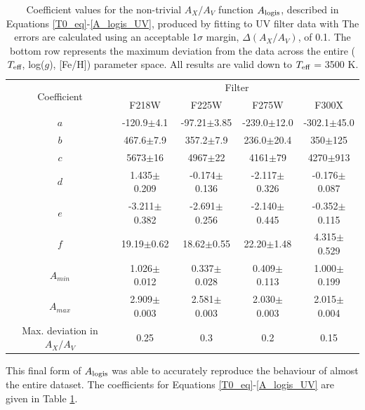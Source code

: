 \documentclass[12pt, a4paper]{report}
\begin{document}
\begin{table}
\begin{center}
\begin{tabular}{ccccc}
\hline
\multirow{2}{*}{Coefficient} & \multicolumn{4}{c}{Filter} \\
 & F218W & F225W & F275W & F300X \\
\hline
$a$ & -120.9$\pm$4.1 & -97.21$\pm$3.85 & -239.0$\pm$12.0 & -302.1$\pm$45.0 \\
$b$ & 467.6$\pm$7.9 & 357.2$\pm$7.9 & 236.0$\pm$20.4 & 350$\pm$125 \\
$c$ & 5673$\pm$16 & 4967$\pm$22 & 4161$\pm$79 & 4270$\pm$913 \\
$d$ & 1.435$\pm$0.209 & -0.174$\pm$0.136 & -2.117$\pm$0.326 & -0.176$\pm$0.087 \\
$e$ & -3.211$\pm$0.382 & -2.691$\pm$0.256  & -2.140$\pm$0.445 & -0.352$\pm$0.115 \\
$f$ & 19.19$\pm$0.62 & 18.62$\pm$0.55  & 22.20$\pm$1.48 & 4.315$\pm$0.529 \\
$A_{min}$ & 1.026$\pm$0.012 & 0.337$\pm$0.028 & 0.409$\pm$0.113 & 1.000$\pm$0.199 \\
$A_{max}$ & 2.909$\pm$0.003 & 2.581$\pm$0.003 & 2.030$\pm$0.003 & 2.015$\pm$0.004 \\
\hline
Max. deviation in $A_{X}/A_{V}$ & 0.25 & 0.3 & 0.2 & 0.15 \\
\hline
\end{tabular}
\caption{Coefficient values for the non-trivial $A_{X}/A_{V}$ function $A_{\textnormal{logis}}$, described in Equations \ref{T0_eq}-\ref{A_logis_UV}, produced by fitting to UV filter data with The errors are calculated using an acceptable 1$\sigma$ margin, $\Delta(A_{X}/A_{V})$, of 0.1. The bottom row represents the maximum deviation from the data across the entire ($T_{\textnormal{eff}}$, log($g$), [Fe/H]) parameter space. All results are valid down to $T_{\textnormal{eff}}$ = 3500 K.}
\label{UV_coeffs_table}
\end{center}
\end{table}

This final form of $A_{\textnormal{logis}}$ was able to accurately reproduce the behaviour of almost the entire dataset. The coefficients for Equations \ref{T0_eq}-\ref{A_logis_UV} are given in Table \ref{UV_coeffs_table}.
\end{document}
